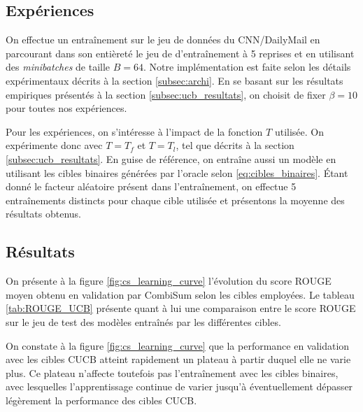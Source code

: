 \subsection{Expériences}

On effectue un entraînement sur le jeu de données du CNN/DailyMail en 
parcourant dans son entièreté le jeu de d'entraînement à 5 reprises
et en utilisant des \textit{minibatches} de taille $B=64$.
Notre implémentation est faite selon les détails expérimentaux décrits à la section 
\ref{subsec:archi}.
En se basant sur les résultats empiriques présentés à la section \ref{subsec:ucb_resultats},
on choisit de fixer $\beta=10$ pour toutes nos expériences.

Pour les expériences, on s'intéresse à
l'impact de la fonction $T$ utilisée.
On expérimente donc avec $T = T_f$ et $T=T_l$,
tel que décrits à la section \ref{subsec:ucb_resultats}.
En guise de référence, on entraîne aussi un modèle 
en utilisant les cibles binaires générées par l'oracle selon \eqref{eq:cibles_binaires}.
Étant donné le facteur aléatoire présent dans l'entraînement, on effectue 
5 entraînements distincts pour chaque cible utilisée et présentons la moyenne
des résultats obtenus.

\subsection{Résultats}

On présente à la figure \ref{fig:cs_learning_curve} l'évolution 
du score ROUGE moyen obtenu en validation par CombiSum selon les cibles employées. 
Le tableau \ref{tab:ROUGE_UCB} présente quant à lui une comparaison 
entre le score ROUGE sur le jeu de test des modèles entraînés 
par les différentes cibles.

On constate à la figure \ref{fig:cs_learning_curve} que la performance en validation avec les cibles 
CUCB atteint rapidement un plateau à partir duquel elle 
ne varie plus.
Ce plateau n'affecte toutefois pas l'entraînement avec les cibles binaires,
avec lesquelles l'apprentissage continue de varier jusqu'à
éventuellement dépasser légèrement la performance des cibles CUCB.

